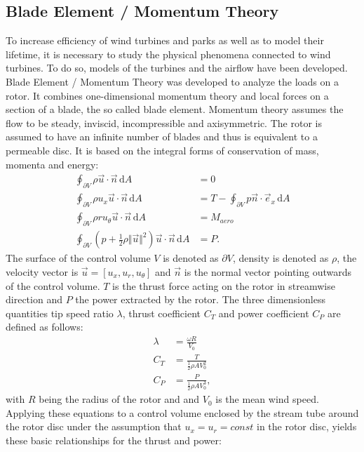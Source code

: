 \subsection{Blade Element / Momentum Theory}
To increase efficiency of wind turbines and parks as well as to model their lifetime, it is necessary to study the physical phenomena connected to wind turbines. To do so, models of the turbines and the airflow have been developed. Blade Element / Momentum Theory was developed to analyze the loads on a rotor. It combines one-dimensional momentum theory and local forces on a section of a blade, the so called blade element. Momentum theory assumes the flow to be steady, inviscid, incompressible and axisymmetric. The rotor is assumed to have an infinite number of blades and thus is equivalent to a permeable disc. It is based on the integral forms of conservation of mass, momenta and energy:
\begin{align}
	\oint_{\partial V} \rho \vec{u} \cdot \vec{n} \, \mathrm{d}A &= 0 \label{eq:mass_cons}\\
	\oint_{\partial V} \rho u_x \vec{u} \cdot \vec{n} \, \mathrm{d}A &= T - \oint_{\partial V} p \vec{n}\cdot \vec{e}_x \, \mathrm{d}A   \label{eq:thrust} \\
	\oint_{\partial V} \rho r u_\theta \vec{u} \cdot \vec{n} \, \mathrm{d}A  &= M_{aero} \label{eq:torque}\\
	\oint_{\partial V} \left(p + \frac{1}{2} \rho \Vert\vec{u} \Vert^2\right) \vec{u} \cdot \vec{n} \, \mathrm{d}A  &= P. \label{eq:power}
\end{align}	The surface of the control volume $V$ is denoted as $\partial V$, density is denoted as $\rho$, the velocity vector is $\vec{u}= \left[u_x, u_r, u_\theta \right]$  and $\vec{n}$ is the normal vector pointing outwards of the control volume. $T$ is the thrust force acting on the rotor in streamwise direction and $P$ the power extracted by the rotor.
The three dimensionless quantities tip speed ratio $\lambda$, thrust coefficient $C_T$ and power coefficient $C_P$ are defined as follows:
\begin{align}
\lambda &= \frac{\omega R}{V_0} \\
C_T &= \frac{T}{\frac{1}{2} \rho A V_0^2} \\
C_P &= \frac{P}{\frac{1}{2} \rho A V_0^3},
\end{align}
with $R$ being the radius of the rotor and and $V_0$ is the mean wind speed.
Applying these equations to a control volume enclosed by the stream tube around the rotor disc under the assumption that $u_x = u_r = const$ in the rotor disc, yields these basic relationships for the thrust and power:
